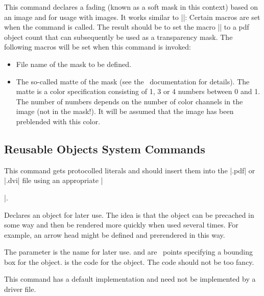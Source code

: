 \begin{command}{\pgfsys@definemask}
  This command declares a fading (known as a soft mask in this
  context) based on an image and for usage with images. It
  works similar to |\pgfsys@defineimage|: Certain macros are set when
  the command is called. The result should be to set the macro
  |\pgf@mask| to a pdf object count that can subsequently be used as a
  transparency mask. The following macros will be set when this command is
  invoked:

  \begin{itemize}
  \item \declare{|\pgf@filename|}
    File name of the mask to be defined.

  \item \declare{|\pgf@maskmatte|}
    The so-called matte of the mask (see the \pdf\ documentation for
    details). The matte is a color specification consisting of 1, 3 or
    4 numbers between 0 and 1. The number of numbers depends on the
    number of color channels in the image (not in the mask!). It will
    be assumed that the image has been preblended with this color.
  \end{itemize}
\end{command}




\subsection{Reusable Objects System Commands}

\begin{command}{\pgfsys@invoke{}}
  This command gets protocolled literals and should insert them into
  the |.pdf| or |.dvi| file using an appropriate |\special|.
\end{command}

\begin{command}{\pgfsys@defobject{}}
  Declares an object for later use. The idea is that the object can be
  precached in some way and then be rendered more quickly when used
  several times. For example, an arrow head might be defined and
  prerendered in this way.

  The parameter  is the name for later use.  and  are \pgfname\ points specifying a bounding
  box for the object.  is the code for the object. The code
  should not be too fancy.

  This command has a default implementation and need not be
  implemented by a driver file.
\end{command}

